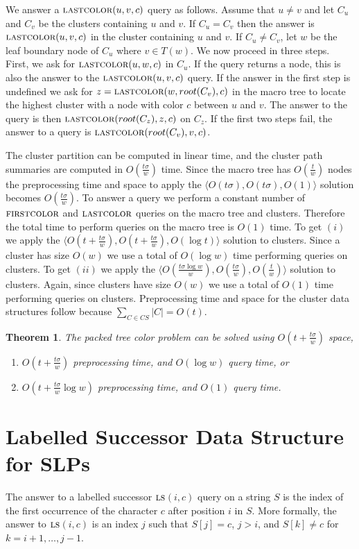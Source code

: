 \documentclass[11pt]{article}
\newcommand{\str}{\ensuremath{S} }
\newcommand{\tree}{\ensuremath{T}}
\newcommand{\fca}{\ensuremath{\textsc{firstcolor}}}
\newcommand{\lca}{\ensuremath{\textsc{lastcolor}}}
\newcommand{\labsuc}{\ensuremath{\textsc{ls}}}
\newtheorem{theorem}{Theorem}
\begin{document}
We answer a $\lca(u,v,c)$ query as follows. Assume that $u\neq v$ and let $C_u$ and $C_v$ be the clusters containing $u$ and $v$. If $C_u=C_v$ then the answer is $\lca(u,v,c)$ in the cluster containing $u$ and $v$. If $C_u\neq C_v$, let $w$ be the leaf boundary node of $C_u$ where $v\in \tree(w)$. We now proceed in three steps. First, we ask for $\lca(u,w,c)$ in $C_u$. If the query returns a node, this is also the answer to the $\lca(u,v,c)$ query. If the answer in the first step is undefined we ask for $z=\lca(w,root(C_v),c)$ in the macro tree to locate the highest cluster with a node with color $c$ between $u$ and $v$. The answer to the query is then $\lca(root(C_z),z,c)$ on $C_z$. If the first two steps fail, the answer to a query is $\lca(root(C_v),v,c)$.

The cluster partition can be computed in linear time, and the cluster path summaries are computed in $O(\frac{t\sigma}{w})$ time. Since the macro tree has $O(\frac t w)$ nodes the preprocessing time and space to apply the $\langle O(t\sigma), O(t\sigma), O(1) \rangle$ solution becomes $O(\frac{t\sigma}{w})$. To answer a query we perform a constant number of $\fca$ and $\lca$ queries on the macro tree and clusters. Therefore the total time to perform queries on the macro tree is $O(1)$ time. To get $(i)$ we apply the $\langle O(t+\frac{t\sigma}{w}), O(t+\frac{t\sigma}{w}), O(\log t) \rangle$ solution to clusters. Since a cluster has size $O(w)$ we use a total of $O(\log w)$ time performing queries on clusters. To get $(ii)$ we apply the $\langle O(\frac{t\sigma\log w}{w}),O(\frac{t\sigma}{w}),O(\frac t w) \rangle$  solution to clusters. Again, since clusters have size $O(w)$ we use a total of $O(1)$ time performing queries on clusters. Preprocessing time and space for the cluster data structures follow because $\sum_{C\in CS}|C|=O(t)$.

\begin{theorem}\label{thm:PTC}
The packed tree color problem can be solved using $O(t+\frac{t\sigma}{w})$ space,
\begin{enumerate}
	\item[\textit{(i)}] $O(t+\frac{t\sigma}{w})$ preprocessing time, and $O(\log w)$ query time, or
	\item[\textit{(ii)}] $O(t+\frac{t\sigma}{w}\log w)$ preprocessing time, and $O(1)$ query time.
\end{enumerate}
\end{theorem}


\section{Labelled Successor Data Structure for SLPs}
The answer to a labelled successor \labsuc$(i,c)$ query on a string $\str$ is the index of the first occurrence of the character $c$ after position $i$ in $\str$. More formally, the answer to \labsuc$(i,c)$ is an index $j$ such that $S[j]=c$, $j>i$, and $S[k]\neq c$ for $k=i+1,\ldots ,j-1$. 
\end{document}
